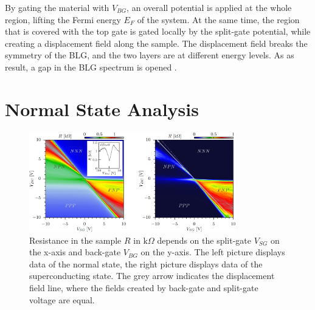 By gating the material with $V_{BG}$, an overall potential is applied at the whole region, lifting the Fermi energy $E_F$ of the system. At the same time, the region that is covered with the top gate is gated locally by the split-gate potential, while creating a displacement field along the sample. The displacement field breaks the symmetry of the BLG, and the two layers are at different energy levels. As as result, a gap in the BLG spectrum is opened \cite{McCann2006}. 

\section{Normal State Analysis}\label{sec:exp-normal-state}
\begin{figure}
\centering
\includegraphics[width=0.8\textwidth]{figure/experiment/resistance-map-edit}
\caption{Resistance in the sample $R$ in $\text{k}\Omega$ depends on the split-gate $V_{SG}$ on the x-axis and back-gate $V_{BG}$ on the y-axis. The left picture displays data of the normal state, the right picture displays data of the superconducting state. The grey arrow indicates the displacement field line, where the fields created by back-gate and split-gate voltage are equal.}\label{fig:gate-map}
\end{figure}
